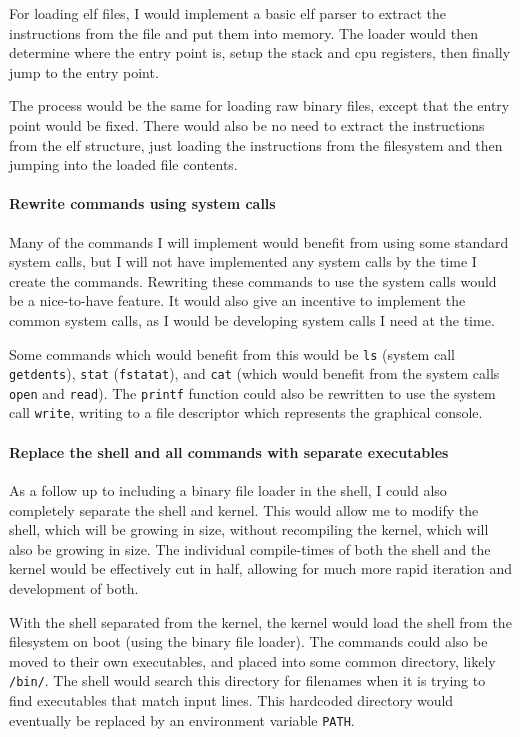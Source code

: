 \documentclass{article}
\begin{document}
For loading \gls{elf} files, I would implement a basic \gls{elf} parser to
extract the instructions from the file and put them into memory. The loader
would then determine where the entry point is, setup the stack and \gls{cpu}
registers, then finally jump to the entry point.

The process would be the same for loading raw binary files, except that the
entry point would be fixed. There would also be no need to extract the
instructions from the \gls{elf} structure, just loading the instructions from
the filesystem and then jumping into the loaded file contents.

\paragraph{Rewrite commands using system calls}
Many of the commands I will implement would benefit from using some standard
system calls, but I will not have implemented any system calls by the time I
create the commands. Rewriting these commands to use the system calls would be
a nice-to-have feature. It would also give an incentive to implement the
common system calls, as I would be developing system calls I need at the time.

Some commands which would benefit from this would be \texttt{ls} (system call
\texttt{getdents}), \texttt{stat} (\texttt{fstatat}), and \texttt{cat} (which
would benefit from the system calls \texttt{open} and \texttt{read}). The
\texttt{printf} function could also be rewritten to use the system call
\texttt{write}, writing to a file descriptor which represents the graphical
console.

\paragraph{Replace the shell and all commands with separate executables}
As a follow up to including a binary file loader in the shell, I could also
completely separate the shell and kernel. This would allow me to modify the
shell, which will be growing in size, without recompiling the kernel, which
will also be growing in size. The individual compile-times of both the shell
and the kernel would be effectively cut in half, allowing for much more rapid
iteration and development of both.

With the shell separated from the kernel, the kernel would load the shell from
the filesystem on boot (using the binary file loader). The commands could also
be moved to their own executables, and placed into some common directory,
likely \texttt{/bin/}. The shell would search this directory for filenames when
it is trying to find executables that match input lines. This hardcoded
directory would eventually be replaced by an environment variable
\texttt{PATH}.
\end{document}
